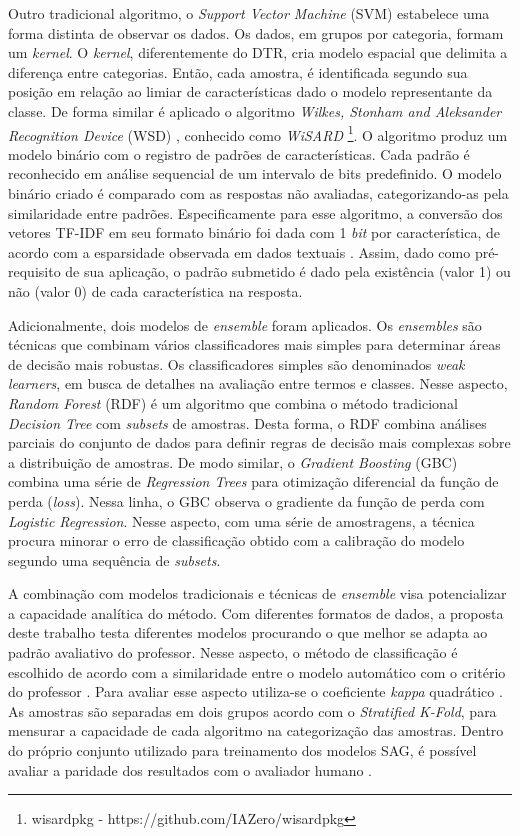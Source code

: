 Outro tradicional algoritmo, o \textit{Support Vector Machine} (SVM) estabelece uma forma distinta de observar os dados. Os dados, em grupos por categoria, formam um \textit{kernel}. O \textit{kernel}, diferentemente do DTR, cria modelo espacial que delimita a diferença entre categorias. Então, cada amostra, é identificada segundo sua posição em relação ao limiar de características dado o modelo representante da classe. De forma similar é aplicado o algoritmo \textit{Wilkes, Stonham and Aleksander Recognition Device} (WSD) \cite{aleksander1984, wisard2020}, conhecido como \textit{WiSARD} \footnote{wisardpkg - https://github.com/IAZero/wisardpkg}. O algoritmo produz um modelo binário com o registro de padrões de características. Cada padrão é reconhecido em análise sequencial de um intervalo de bits predefinido. O modelo binário criado é comparado com as respostas não avaliadas, categorizando-as pela similaridade entre padrões. Especificamente para esse algoritmo, a conversão dos vetores TF-IDF em seu formato binário foi dada com 1 \textit{bit} por característica, de acordo com a esparsidade observada em dados textuais \cite{manning1999}. Assim, dado como pré-requisito de sua aplicação, o padrão submetido é dado pela existência (valor 1) ou não (valor 0) de cada característica na resposta.

Adicionalmente, dois modelos de \textit{ensemble} foram aplicados. Os \textit{ensembles} são técnicas que combinam vários classificadores mais simples para determinar áreas de decisão mais robustas. Os classificadores simples são denominados \textit{weak learners}, em busca de detalhes na avaliação entre termos e classes. Nesse aspecto, \textit{Random Forest} (RDF) é um algoritmo que combina o método tradicional \textit{Decision Tree} com \textit{subsets} de amostras. Desta forma, o RDF combina análises parciais do conjunto de dados para definir regras de decisão mais complexas sobre a distribuição de amostras. De modo similar, o \textit{Gradient Boosting} (GBC) combina uma série de \textit{Regression Trees} para otimização diferencial da função de perda (\textit{loss}). Nessa linha, o GBC observa o gradiente da função de perda com \textit{Logistic Regression}. Nesse aspecto, com uma série de amostragens, a técnica procura minorar o erro de classificação obtido com a calibração do modelo segundo uma sequência de \textit{subsets}. 

A combinação com modelos tradicionais e técnicas de \textit{ensemble} visa potencializar a capacidade analítica do método. Com diferentes formatos de dados, a proposta deste trabalho testa diferentes modelos procurando o que melhor se adapta ao padrão avaliativo do professor. Nesse aspecto, o método de classificação é escolhido de acordo com a similaridade entre o modelo automático com o critério do professor \cite{pado2021}. Para avaliar esse aspecto utiliza-se o coeficiente \textit{kappa} quadrático \cite{cohen1960}. As amostras são separadas em dois grupos acordo com o \textit{Stratified K-Fold}, para mensurar a capacidade de cada algoritmo na categorização das amostras. Dentro do próprio conjunto utilizado para treinamento dos modelos SAG, é possível avaliar a paridade dos resultados com o avaliador humano \cite{artstein2008}.

